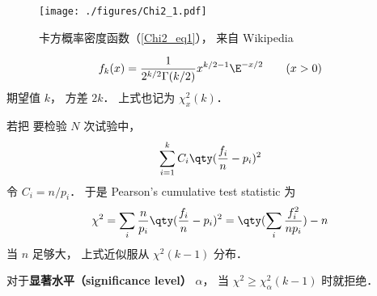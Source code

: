 
\begin{issues}
\issueDraft
\end{issues}

\begin{figure}[ht]
\centering
\texttt{[image: ./figures/Chi2\_1.pdf]}
\caption{卡方概率密度函数（\autoref{Chi2_eq1}）， 来自 Wikipedia} \label{Chi2_fig1}
\end{figure}

\begin{equation}\label{Chi2_eq1}
f_k(x) = \frac{1}{2^{k/2}\Gamma(k/2)}x^{k/2-1}\E^{-x/2} \qquad (x > 0)
\end{equation}
期望值 $k$， 方差 $2k$． 上式也记为 $\chi_x^2(k)$．


若把 要检验 $N$ 次试验中， 
\begin{equation}
\sum_{i=1}^k C_i \qty(\frac{f_i}{n} - p_i)^2
\end{equation}
令 $C_i = n/p_i$． 于是 Pearson's cumulative test statistic 为
\begin{equation}
\chi^2 = \sum_i \frac{n}{p_i} \qty(\frac{f_i}{n} - p_i)^2 = \qty(\sum_i \frac{f_i^2}{np_i}) - n
\end{equation}
当 $n$ 足够大， 上式近似服从 $\chi^2(k-1)$ 分布．

对于\textbf{显著水平（significance level）} $\alpha$， 当 $\chi^2 \geqslant \chi_\alpha^2(k-1)$ 时就拒绝．

